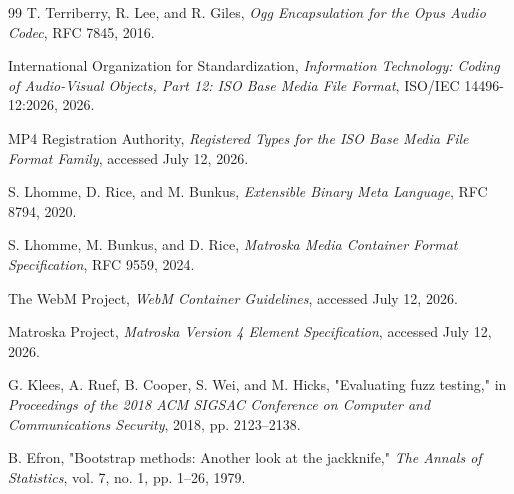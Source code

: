\begin{thebibliography}{99}
T. Terriberry, R. Lee, and R. Giles, \emph{Ogg Encapsulation for the
Opus Audio Codec}, RFC 7845, 2016.

International Organization for Standardization,
\emph{Information Technology: Coding of Audio-Visual Objects, Part 12:
ISO Base Media File Format}, ISO/IEC 14496-12:2026, 2026.

MP4 Registration Authority, \emph{Registered Types for the ISO Base Media
File Format Family}, accessed July 12, 2026.

S. Lhomme, D. Rice, and M. Bunkus,
\emph{Extensible Binary Meta Language}, RFC 8794, 2020.

S. Lhomme, M. Bunkus, and D. Rice, \emph{Matroska Media Container Format
Specification}, RFC 9559, 2024.

The WebM Project, \emph{WebM Container Guidelines}, accessed July 12, 2026.

Matroska Project, \emph{Matroska Version 4 Element Specification},
accessed July 12, 2026.

G. Klees, A. Ruef, B. Cooper, S. Wei, and M. Hicks,
"Evaluating fuzz testing," in \emph{Proceedings of the 2018 ACM SIGSAC
Conference on Computer and Communications Security}, 2018, pp. 2123--2138.

B. Efron, "Bootstrap methods: Another look at the jackknife,"
\emph{The Annals of Statistics}, vol. 7, no. 1, pp. 1--26, 1979.

\end{thebibliography}
\endgroup
